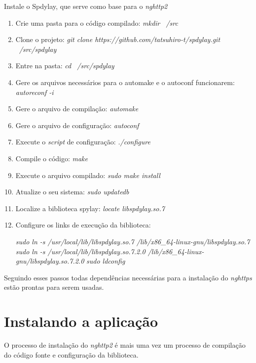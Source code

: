 \begin{apendicesenv}
Instale o Spdylay, que serve como base para o \textit{nghttp2}
\begin{enumerate}
	\item Crie uma pasta para o código compilado: \textit{mkdir ~/src}
	\item Clone o projeto: \textit{git clone https://github.com/tatsuhiro-t/spdylay.git ~/src/spdylay}
	\item Entre na pasta: \textit{cd ~/src/spdylay}
	\item Gere os arquivos necessários para o automake e o autoconf funcionarem: \textit{autoreconf -i}
	\item Gere o arquivo de compilação: \textit{automake}
	\item Gere o arquivo de configuração: \textit{autoconf}
	\item Execute o \textit{script} de configuração: \textit{./configure}
	\item Compile o código: \textit{make}
	\item Execute o arquivo compilado: \textit{sudo make install}
	\item Atualize o seu sistema: \textit{sudo updatedb}
	\item Localize a biblioteca spylay: \textit{locate libspdylay.so.7}
	\item Configure os links de execução da biblioteca:
		\begin{center}
			\textit{sudo ln -s /usr/local/lib/libspdylay.so.7 /lib/x86\_64-linux-gnu/libspdylay.so.7}
			\textit{sudo ln -s /usr/local/lib/libspdylay.so.7.2.0 /lib/x86\_64-linux-gnu/libspdylay.so.7.2.0}
			\textit{sudo ldconfig}
		\end{center}
\end{enumerate}

Seguindo esses passos todas dependências necessárias para a instalação do \textit{nghttps} estão prontas para serem usadas.

\section{Instalando a aplicação}
O processo de instalação do \textit{nghttp2} é mais uma vez um processo de compilação do código fonte e configuração da biblioteca.


\end{apendicesenv}
